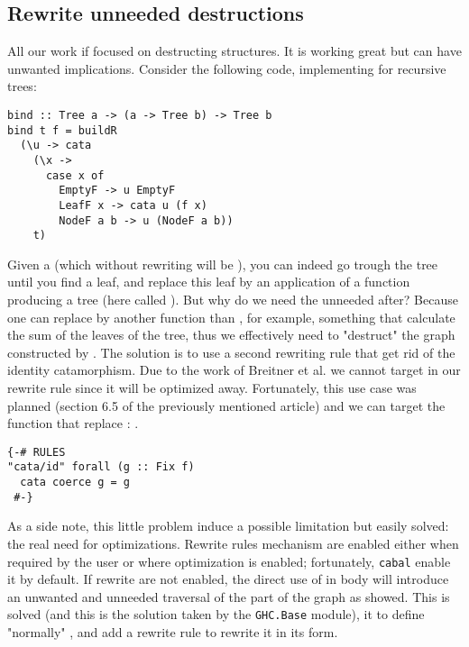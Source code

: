 \subsection{Rewrite unneeded destructions}
\label{sec:bind-def}
All our work if focused on destructing structures. It is working great but can have unwanted implications. Consider the following code, implementing  for recursive trees:

\begin{verbatim}
bind :: Tree a -> (a -> Tree b) -> Tree b
bind t f = buildR
  (\u -> cata
    (\x ->
      case x of
        EmptyF -> u EmptyF
        LeafF x -> cata u (f x)
        NodeF a b -> u (NodeF a b))
    t)
\end{verbatim}

\noindent Given a  (which without rewriting will be ), you can indeed go trough the tree until you find a leaf, and replace this leaf by an application of a function producing a tree (here called ). But why do we need the unneeded  after? Because one can replace  by another function than , for example, something that calculate the sum of the leaves of the tree, thus we effectively need to "destruct" the graph constructed by . The solution is to use a second rewriting rule that get rid of the identity catamorphism. Due to the work of Breitner et al. \cite{Breitner:2014:SZC:2692915.2628141} we cannot target  in our rewrite rule since it will be optimized away. Fortunately, this use case was planned (section 6.5 of the previously mentioned article) and we can target the function that replace : .

\begin{verbatim}
{-# RULES
"cata/id" forall (g :: Fix f)
  cata coerce g = g
 #-}
\end{verbatim}

\noindent As a side note, this little problem induce a possible limitation but easily solved: the real need for optimizations. Rewrite rules mechanism are enabled either when required by the user or where optimization is enabled; fortunately, \verb|cabal| enable it by default. If rewrite are not enabled, the direct use of  in  body will introduce an unwanted and unneeded traversal of the part of the graph as showed. This is solved (and this is the solution taken by the \verb|GHC.Base| module), it to define "normally" , and add a rewrite rule to rewrite it in its  form.

